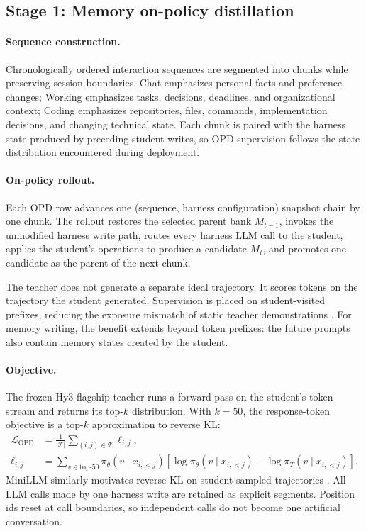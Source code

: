 \documentclass{article}
\begin{document}
\subsection{Stage 1: Memory on-policy distillation}

\paragraph{Sequence construction.}
Chronologically ordered interaction sequences are segmented into chunks while preserving session boundaries. Chat emphasizes personal facts and preference changes; Working emphasizes tasks, decisions, deadlines, and organizational context; Coding emphasizes repositories, files, commands, implementation decisions, and changing technical state. Each chunk is paired with the harness state produced by preceding student writes, so OPD supervision follows the state distribution encountered during deployment.

\paragraph{On-policy rollout.}
Each OPD row advances one (sequence, harness configuration) snapshot chain by one chunk. The rollout restores the selected parent bank $M_{t-1}$, invokes the unmodified harness write path, routes every harness LLM call to the student, applies the student's operations to produce a candidate $M_t$, and promotes one candidate as the parent of the next chunk.

The teacher does not generate a separate ideal trajectory. It scores tokens on the trajectory the student generated. Supervision is placed on student-visited prefixes, reducing the exposure mismatch of static teacher demonstrations \citep{minillm}. For memory writing, the benefit extends beyond token prefixes: the future prompts also contain memory states created by the student.

\paragraph{Objective.}
The frozen Hy3 flagship teacher runs a forward pass on the student's token stream and returns its top-$k$ distribution. With $k=50$, the response-token objective is a top-$k$ approximation to reverse KL:
\begin{equation}
\begin{aligned}
\mathcal{L}_{\mathrm{OPD}}
&= \frac{1}{|\mathcal{T}|}
   \sum_{(i,j)\in\mathcal{T}} \ell_{i,j}, \\
\ell_{i,j}
&= \sum_{v\in\mathrm{top}\text{-}50}
   \pi_\theta(v\mid x_{i,<j})
   \left[
   \log\pi_\theta(v\mid x_{i,<j})
   -\log\pi_T(v\mid x_{i,<j})
   \right].
\end{aligned}
\end{equation}
MiniLLM similarly motivates reverse KL on student-sampled trajectories \citep{minillm}. All LLM calls made by one harness write are retained as explicit segments. Position ids reset at call boundaries, so independent calls do not become one artificial conversation.
\end{document}
